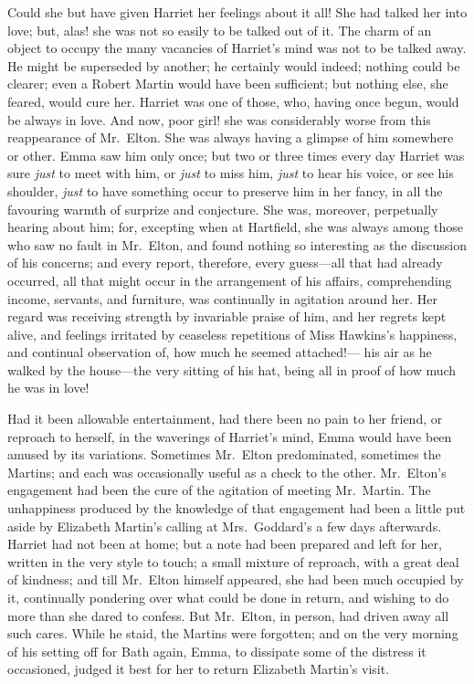 Could she but have given Harriet her feelings about it all!
She had talked her into love; but, alas! she was not so easily to be
talked out of it.  The charm of an object to occupy the many vacancies
of Harriet's mind was not to be talked away.  He might be superseded
by another; he certainly would indeed; nothing could be clearer;
even a Robert Martin would have been sufficient; but nothing else,
she feared, would cure her.  Harriet was one of those, who,
having once begun, would be always in love.  And now, poor girl!
she was considerably worse from this reappearance of Mr.\ Elton.
She was always having a glimpse of him somewhere or other.  Emma saw
him only once; but two or three times every day Harriet was sure
\emph{just} to meet with him, or \emph{just} to miss him, \emph{just} to hear his voice,
or see his shoulder, \emph{just} to have something occur to preserve him
in her fancy, in all the favouring warmth of surprize and conjecture.
She was, moreover, perpetually hearing about him; for, excepting when
at Hartfield, she was always among those who saw no fault in Mr.\ Elton,
and found nothing so interesting as the discussion of his concerns;
and every report, therefore, every guess---all that had already
occurred, all that might occur in the arrangement of his affairs,
comprehending income, servants, and furniture, was continually
in agitation around her.  Her regard was receiving strength by
invariable praise of him, and her regrets kept alive, and feelings
irritated by ceaseless repetitions of Miss Hawkins's happiness,
and continual observation of, how much he seemed attached!---%
his air as he walked by the house---the very sitting of his hat,
being all in proof of how much he was in love!

Had it been allowable entertainment, had there been no pain
to her friend, or reproach to herself, in the waverings of
Harriet's mind, Emma would have been amused by its variations.
Sometimes Mr.\ Elton predominated, sometimes the Martins; and each
was occasionally useful as a check to the other.  Mr.\ Elton's
engagement had been the cure of the agitation of meeting Mr.\ Martin.
The unhappiness produced by the knowledge of that engagement had been
a little put aside by Elizabeth Martin's calling at Mrs.\ Goddard's
a few days afterwards.  Harriet had not been at home; but a note had
been prepared and left for her, written in the very style to touch;
a small mixture of reproach, with a great deal of kindness;
and till Mr.\ Elton himself appeared, she had been much occupied
by it, continually pondering over what could be done in return,
and wishing to do more than she dared to confess.  But Mr.\ Elton,
in person, had driven away all such cares.  While he staid,
the Martins were forgotten; and on the very morning of his setting off
for Bath again, Emma, to dissipate some of the distress it occasioned,
judged it best for her to return Elizabeth Martin's visit.

